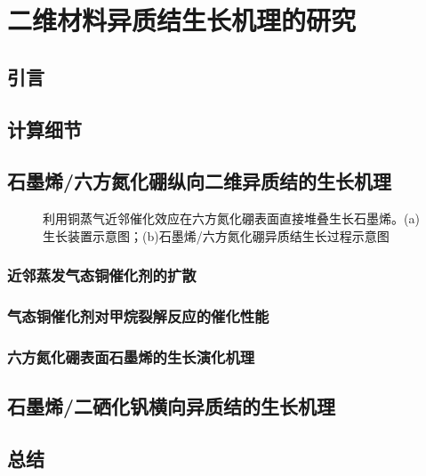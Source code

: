 \chapter{二维材料异质结生长机理的研究}
\section{引言}
\section{计算细节}
\section{石墨烯/六方氮化硼纵向二维异质结的生长机理}

    \begin{figure}[htb]
        \newline
        \caption{利用铜蒸气近邻催化效应在六方氮化硼表面直接堆叠生长石墨烯。(a)生长装置示意图；(b)石墨烯/六方氮化硼异质结生长过程示意图}
        \label{fig:CG_diagram_CVD}
    \end{figure}

    \subsection{近邻蒸发气态铜催化剂的扩散}

    \subsection{气态铜催化剂对甲烷裂解反应的催化性能}
    \subsection{六方氮化硼表面石墨烯的生长演化机理}
\section{石墨烯/二硒化钒横向异质结的生长机理}
\section{总结}